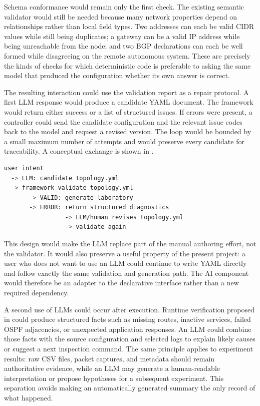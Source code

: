 Schema conformance would remain only the first check. The existing semantic
validator would still be needed because many network properties depend on
relationships rather than local field types. Two addresses can each be valid
CIDR values while still being duplicates; a gateway can be a valid IP address
while being unreachable from the node; and two BGP declarations can each be
well formed while disagreeing on the remote autonomous system. These are
precisely the kinds of checks for which deterministic code is preferable to
asking the same model that produced the configuration whether its own answer is
correct.

The resulting interaction could use the validation report as a repair protocol.
A first LLM response would produce a candidate YAML document. The framework
would return either success or a list of structured issues. If errors were
present, a controller could send the candidate configuration and the relevant
issue codes back to the model and request a revised version. The loop would be
bounded by a small maximum number of attempts and would preserve every candidate
for traceability. A conceptual exchange is shown in
.

\begin{lstlisting}[language=bash,caption={Conceptual LLM-assisted validation loop.},label={lst:future-llm-loop}]
user intent
  -> LLM: candidate topology.yml
  -> framework validate topology.yml
       -> VALID: generate laboratory
       -> ERROR: return structured diagnostics
                 -> LLM/human revises topology.yml
                 -> validate again
\end{lstlisting}

This design would make the LLM replace part of the manual authoring effort, not
the validator. It would also preserve a useful property of the present project:
a user who does not want to use an LLM could continue to write YAML directly
and follow exactly the same validation and generation path. The AI component
would therefore be an adapter to the declarative interface rather than a new
required dependency.

A second use of LLMs could occur after execution. Runtime verification proposed
in  could produce structured facts such as
missing routes, inactive services, failed OSPF adjacencies, or unexpected
application responses. An LLM could combine those facts with the source
configuration and selected logs to explain likely causes or suggest a next
inspection command. The same principle applies to experiment results: raw CSV
files, packet captures, and metadata should remain authoritative evidence, while
an LLM may generate a human-readable interpretation or propose hypotheses for a
subsequent experiment. This separation avoids making an automatically generated
summary the only record of what happened.

